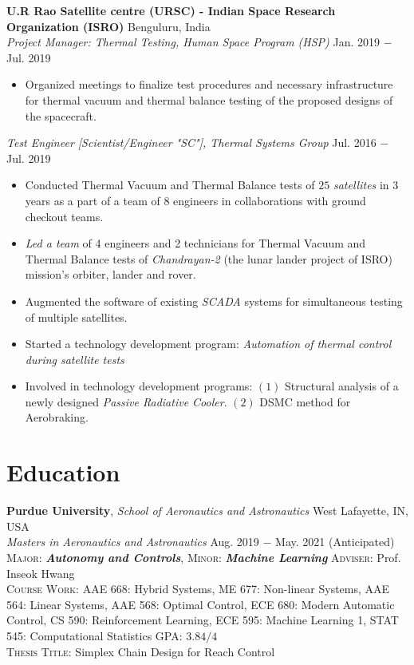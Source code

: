 \documentclass[letterpaper,10pt]{article}
\begin{document}
\vspace{5pt}
\noindent \textbf{U.R Rao Satellite centre (URSC) - Indian Space Research Organization (ISRO)} \hfill Benguluru, India \\
\textit{Project Manager: Thermal Testing, Human Space Program (HSP)} \hfill Jan. 2019 $-$ Jul. 2019
\begin{itemize}[noitemsep,nolistsep,leftmargin=0.25in,label={--}]
    \item Organized meetings to finalize test procedures and necessary infrastructure for thermal vacuum and thermal balance testing of the proposed designs of the spacecraft.
\end{itemize}

\vspace{3pt}
\textit{Test Engineer [Scientist/Engineer "SC"], Thermal Systems Group} \hfill Jul. 2016 $-$ Jul. 2019
\begin{itemize}[noitemsep,nolistsep,leftmargin=0.25in,label={--}]
    \item Conducted Thermal Vacuum and Thermal Balance tests of $25$ \textit{satellites} in 3 years as a part of a team of 8 engineers in collaborations with ground checkout teams.
	\item \textit{Led a team} of 4 engineers and 2 technicians for Thermal Vacuum and Thermal Balance tests of \textit{Chandrayan-2} (the lunar lander project of ISRO) mission's orbiter, lander and rover. 
    \item Augmented the software of existing \textit{SCADA} systems for simultaneous testing of multiple satellites.  
	\item Started a technology development program: \textit{Automation of thermal control during satellite tests}
	\item Involved in technology development programs: $(1)$ Structural analysis of a newly designed \textit{Passive Radiative Cooler}. $(2)$ DSMC method for Aerobraking.
\end{itemize}



\section{Education}
\noindent \textbf{Purdue University}, \textit{School of Aeronautics and Astronautics} \hfill West Lafayette, IN, USA \\
\textit{Masters in Aeronautics and Astronautics} \hfill Aug. 2019 $-$ May. 2021 (Anticipated)\\
\textsc{Major}: \textit{\textbf{Autonomy and Controls}}, \textsc{Minor}: \textit{\textbf{Machine Learning}} \hfill \textsc{Adviser}: Prof. Inseok Hwang\\
\textsc{Course Work}: AAE 668: Hybrid Systems, ME 677: Non-linear Systems, AAE 564: Linear Systems,  AAE 568: Optimal Control, ECE 680: Modern Automatic Control, CS 590: Reinforcement Learning, ECE 595: Machine Learning 1, STAT 545: Computational Statistics
\hfill \textsc{GPA}: $3.84/4$\\
\textsc{Thesis Title}: Simplex Chain Design for Reach Control \\
\end{document}
